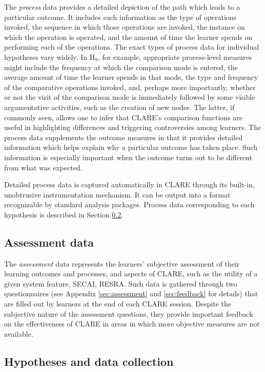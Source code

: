 The {\it process\/} data provides a detailed depiction of the path which
leads to a particular outcome. It includes such information as the type of
operations invoked, the sequence in which those operations are invoked, the
instance on which the operation is operated, and the amount of time the
learner spends on performing each of the operations. The exact types of
process data for individual hypotheses vary widely. In {\sf H\(_9\)\/}, for
example, appropriate process-level measures might include the frequency at
which the comparison mode is entered, the average amount of time the
learner spends in that mode, the type and frequency of the comparative
operations invoked, and, perhaps more importantly, whether or not the visit
of the comparison mode is immediately followed by some visible
argumentative activities, such as the creation of new nodes. The latter, if
commonly seen, allows one to infer that CLARE's comparison functions are
useful in highlighting differences and triggering controversies among
learners. The process data supplements the outcome measures in that it
provides detailed information which helps explain why a particular outcome
has taken place.  Such information is especially important when the outcome
turns out to be different from what was expected.

Detailed process data is captured automatically in CLARE through its
built-in, unobtrusive instrumentation mechanism. It can be output into a
format recognizable by standard analysis packages. Process data
corresponding to each hypothesis is described in Section
\ref{sec:hypotheses data}.


\subsection{Assessment data}
\label{sec:assessment data}

The {\it assessment\/} data represents the learners' subjective assessment
of their learning outcomes and processes, and aspects of CLARE, such as the
utility of a given system feature, SECAI, RESRA.  Such data is gathered
through two questionnaires (see Appendix \ref{sec:assessment} and
\ref{sec:feedback} for details) that are filled out by learners at the end
of each CLARE session. Despite the subjective nature of the assessment
questions, they provide important feedback on the effectiveness of CLARE in
areas in which more objective measures are not available.


\subsection{Hypotheses and data collection}
\label{sec:hypotheses data}

